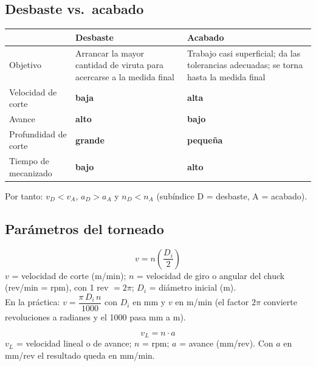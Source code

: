 \documentclass[12pt,a4paper]{article}
\begin{document}
\subsection{Desbaste vs.\ acabado}
\begin{center}
	\begin{tabularx}{\linewidth}{@{}lXX@{}}
		\toprule
		                     & \textbf{Desbaste}
		                     & \textbf{Acabado}
		\\
		\midrule
		Objetivo             & Arrancar la mayor cantidad de viruta para acercarse a
		la medida final
		                     & Trabajo casi superficial; da las tolerancias
		adecuadas; se torna hasta la
		medida final
		\\
		Velocidad de corte   & \textbf{baja}
		                     & \textbf{alta}
		\\
		Avance               & \textbf{alto}
		                     & \textbf{bajo}
		\\
		Profundidad de corte & \textbf{grande}
		                     & \textbf{pequeña}
		\\
		Tiempo de mecanizado & \textbf{bajo}
		                     & \textbf{alto}
		\\
		\bottomrule
	\end{tabularx}
\end{center}
Por tanto: $v_D < v_A$, $a_D > a_A$ y $n_D < n_A$ (subíndice D = desbaste, A =
acabado).

\subsection{Parámetros del torneado}

\begin{formu}
	\[ v = n\left(\frac{D_i}{2}\right) \]
	$v$ = velocidad de corte (m/min); $n$ = velocidad de giro o angular del chuck
	(rev/min = rpm), con 1 rev $= 2\pi$; $D_i$ = diámetro inicial (m).\\
	En la práctica: $v = \dfrac{\pi\, D_i\, n}{1000}$ con $D_i$ en mm y $v$ en
	m/min
	(el factor $2\pi$ convierte revoluciones a radianes y el 1000 pasa mm a m).
\end{formu}

\begin{formu}
	\[ v_L = n\cdot a \]
	$v_L$ = velocidad lineal o de avance; $n$ = rpm; $a$ = avance (mm/rev). Con
	$a$
	en mm/rev el resultado queda en mm/min.
\end{formu}
\end{document}
